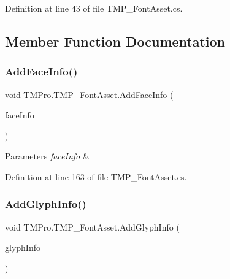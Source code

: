 Definition at line 43 of file T\+M\+P\+\_\+\+Font\+Asset.\+cs.



\subsection{Member Function Documentation}
\mbox{\label{class_t_m_pro_1_1_t_m_p___font_asset_a8189329802859389f3dd6152b4f9917f}} 
\subsubsection{\texorpdfstring{AddFaceInfo()}{AddFaceInfo()}}
{\footnotesize\ttfamily void T\+M\+Pro.\+T\+M\+P\+\_\+\+Font\+Asset.\+Add\+Face\+Info (\begin{DoxyParamCaption}\item[{\mbox{\hyperlink{class_t_m_pro_1_1_face_info}{Face\+Info}}}]{face\+Info }\end{DoxyParamCaption})}






\begin{DoxyParams}{Parameters}
{\em face\+Info} & \\
\hline
\end{DoxyParams}


Definition at line 163 of file T\+M\+P\+\_\+\+Font\+Asset.\+cs.

\mbox{\label{class_t_m_pro_1_1_t_m_p___font_asset_a6002e55fa6fdd78bbc65dac68e9f9192}} 
\subsubsection{\texorpdfstring{AddGlyphInfo()}{AddGlyphInfo()}}
{\footnotesize\ttfamily void T\+M\+Pro.\+T\+M\+P\+\_\+\+Font\+Asset.\+Add\+Glyph\+Info (\begin{DoxyParamCaption}\item[{\mbox{\hyperlink{class_t_m_pro_1_1_t_m_p___glyph}{T\+M\+P\+\_\+\+Glyph}} \mbox{[}$\,$\mbox{]}}]{glyph\+Info }\end{DoxyParamCaption})}






